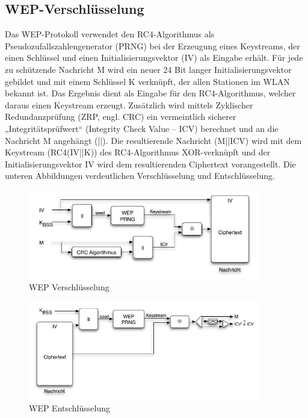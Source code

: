 	\subsection{WEP-Verschlüsselung}

	Das WEP-Protokoll verwendet den RC4-Algorithmus als Pseudozufallszahlengenerator (PRNG) bei der Erzeugung eines Keystreams, der einen Schlüssel und einen Initialisierungsvektor (IV) als Eingabe erhält. Für jede zu schützende Nachricht M wird ein neuer 24 Bit langer Initialisierungsvektor gebildet und mit einem Schlüssel K verknüpft, der allen Stationen im WLAN bekannt ist. Das Ergebnis dient als Eingabe für den RC4-Algorithmus, welcher daraus einen Keystream erzeugt. Zusätzlich wird mittels Zyklischer Redundanzprüfung (ZRP, engl. CRC) ein vermeintlich sicherer „Integritätsprüfwert“ (Integrity Check Value – ICV) berechnet und an die Nachricht M angehängt (||). Die resultierende Nachricht (M||ICV) wird mit dem Keystream (RC4(IV||K)) des RC4-Algorithmus XOR-verknüpft und der Initialisierungsvektor IV wird dem resultierenden Ciphertext vorangestellt. Die unteren Abbildungen verdeutlichen Verschlüsselung und Entschlüsselung.

	\begin{figure}[H]
		\centering
		\includegraphics[width=0.9\textwidth]{images/WLAN/WEPKodierung.JPG}
		\caption{WEP Verschlüsselung}
		\label{fig:WEP Verschlüsselung}
	\end{figure}

	\begin{figure}[H]
		\centering
		\includegraphics[width=0.9\textwidth]{images/WLAN/WEPDekodierung.JPG}
		\caption{WEP Entschlüsselung}
		\label{fig:WEP Entschlüsselung}
	\end{figure}

